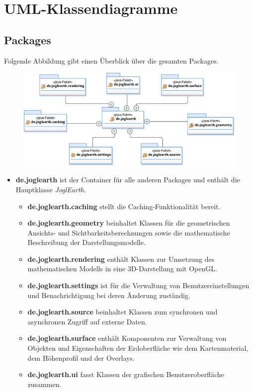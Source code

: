 \documentclass[10pt]{scrreprt}
\begin{document}
\chapter{UML-Klassendiagramme}

\section{Packages}
Folgende Abbildung gibt einen Überblick über die gesamten Packages.\\

\begin{figure}[!htb]
\begin{center}
	\includegraphics[scale=0.55]{Pakete.eps}
\end{center}
\end{figure}

\begin{itemize}
\item \textbf{\sffamily de.joglearth} ist der Container für alle anderen Packages und enthält die Hauptklasse \textit{JoglEarth}.
\begin{itemize}
\item \textbf{\sffamily de.joglearth.caching} stellt die Caching-Funktionalität bereit.
\item \textbf{\sffamily de.joglearth.geometry} beinhaltet Klassen für die geometrischen Ansichts- und Sichtbarkeitsberechnungen sowie die mathematische Beschreibung der Darstellungsmodelle.
\item \textbf{\sffamily de.joglearth.rendering} enthält Klassen zur Umsetzung des mathematischen Modells in eine 3D-Darstellung mit OpenGL.
\item \textbf{\sffamily de.joglearth.settings} ist für die Verwaltung von Benutzereinstellungen und Benachrichtigung bei deren Änderung zuständig.
\item \textbf{\sffamily de.joglearth.source} beinhaltet Klassen zum synchronen und asynchronen Zugriff auf externe Daten.
\item \textbf{\sffamily de.joglearth.surface} enthält Komponenten zur Verwaltung von Objekten und Eigenschaften der Erdoberfläche wie dem Kartenmaterial, dem Höhenprofil und der Overlays.
\item \textbf{\sffamily de.joglearth.ui} fasst Klassen der grafischen Benutzeroberfläche zusammen.
\end{itemize}
\end{itemize}
\end{document}
